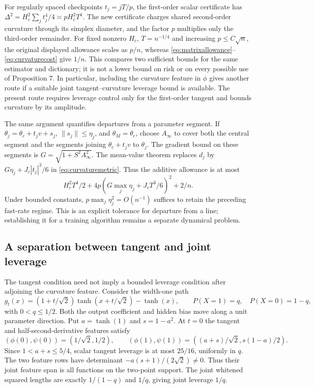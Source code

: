\documentclass[pdflatex,sn-mathphys-ay]{sn-jnl}
\theoremstyle{remark}\newtheorem{remark}[theorem]{Remark}
\begin{document}
For regularly spaced checkpoints $t_j=jT/p$, the first-order scalar certificate has
$\Delta^2=H_c^2\sum_jt_j^4/4\asymp pH_c^2T^4$. The new certificate charges shared second-order curvature through its simplex diameter, and the factor $p$ multiplies only the third-order remainder. For fixed nonzero $H_c$, $T=n^{-1/4}$ and increasing $p\leq C\sqrt n$, the original displayed allowance scales as $p/n$, whereas \eqref{eq:matrixallowance}--\eqref{eq:curvaturecost} give $1/n$. This compares two sufficient bounds for the same estimator and dictionary; it is not a lower bound on risk or on every possible use of Proposition 7. In particular, including the curvature feature in $\phi$ gives another route if a suitable joint tangent--curvature leverage bound is available. The present route requires leverage control only for the first-order tangent and bounds curvature by its amplitude.

The same argument quantifies departures from a parameter segment. If $\theta_j=\theta_c+t_jv+s_j$, $\|s_j\|\leq\eta_j$, and $\theta_M=\theta_c$, choose $A_\infty$ to cover both the central segment and the segments joining $\theta_c+t_jv$ to $\theta_j$. The gradient bound on these segments is $G=\sqrt{1+S^2A_\infty^2}$. The mean-value theorem replaces $d_j$ by $G\eta_j+J_c|t_j|^3/6$ in \eqref{eq:curvaturemetric}. Thus the additive allowance is at most
\[
 H_c^2T^4/2+4p(G\max_j\eta_j+J_cT^3/6)^2+2/n.
\]
Under bounded constants, $p\max_j\eta_j^2=O(n^{-1})$ suffices to retain the preceding fast-rate regime. This is an explicit tolerance for departure from a line; establishing it for a training algorithm remains a separate dynamical problem.

\subsection{A separation between tangent and joint leverage}
The tangent condition need not imply a bounded leverage condition after adjoining the curvature feature. Consider the width-one path
\[
 g_t(x)=(1+t/\sqrt2)\tanh(x+t/\sqrt2)-\tanh(x),
 \qquad P(X=1)=q,\quad P(X=0)=1-q,
\]
with $0<q\leq1/2$. Both the output coefficient and hidden bias move along a unit parameter direction. Put $a=\tanh(1)$ and $s=1-a^2$. At $t=0$ the tangent and half-second-derivative features satisfy
\[
 (\phi(0),\psi(0))=(1/\sqrt2,1/2),\qquad
 (\phi(1),\psi(1))=((a+s)/\sqrt2,s(1-a)/2).
\]
Since $1<a+s\leq5/4$, scalar tangent leverage is at most $25/16$, uniformly in $q$. The two feature rows have determinant $-a(s+1)/(2\sqrt2)\ne0$. Thus their joint feature span is all functions on the two-point support. The joint whitened squared lengths are exactly $1/(1-q)$ and $1/q$, giving joint leverage $1/q$.
\end{document}
